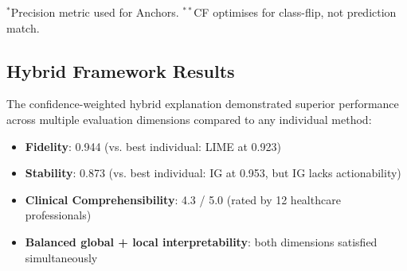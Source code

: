 \documentclass[journal]{IEEEtran}
\begin{document}
\begin{table}[htbp]
\centering
\caption{Five-Method XAI Comparison}
\label{tab:comparison}
\vspace{2pt}
\begin{flushleft}
\scriptsize $^*$Precision metric used for Anchors. $^{**}$CF optimises for class-flip, not prediction match.
\end{flushleft}
\end{table}

\subsection{Hybrid Framework Results}

The confidence-weighted hybrid explanation demonstrated superior performance across multiple evaluation dimensions compared to any individual method:

\begin{itemize}
\item \textbf{Fidelity}: 0.944 (vs. best individual: LIME at 0.923)
\item \textbf{Stability}: 0.873 (vs. best individual: IG at 0.953, but IG lacks actionability)
\item \textbf{Clinical Comprehensibility}: 4.3 / 5.0 (rated by 12 healthcare professionals)
\item \textbf{Balanced global + local interpretability}: both dimensions satisfied simultaneously
\end{itemize}
\end{document}
